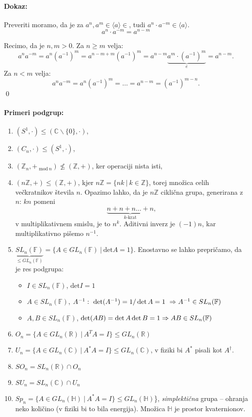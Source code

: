 \paragraph{Dokaz:}
Preveriti moramo, da je za $a^n,a^m \in \langle a \rangle \in$, tudi $a^n\cdot a^{-m} \in \langle a\rangle$.
\[
	a^n\cdot a^{-m} = a^{n-m}
\]

\ni Recimo, da je $n,m > 0$. Za $n \geq m$ velja:
\[
	a^n a^{-m} = a^n (a^{-1})^m = a^{n-m+m} (a^{-1})^m = a^{n-m} \underbrace{a^m\cdot(a^{-1})^m}_{e} = a^{n-m}.
\]
Za $n < m$ velja:
\[
	a^n a^{-m} = a^n(a^{-1})^m = \ldots = a^{n-m} = (a^{-1})^{m-n}.
\]
\qed

\paragraph{Primeri podgrup:}
\begin{enumerate}
	\item{$(S^1,\cdot) \leq (\mathbb{C}\backslash\{0\}, \cdot)$},
	\item{$(C_n,\cdot) \leq (S^1, \cdot)$},
	\item{$(\mathbb{Z}_n, +\ {}_{\text{mod}\ n}) \nleq (\mathbb{Z}, +)$, ker operaciji nista isti,}
	\item{$(n\mathbb{Z}, +) \leq (\mathbb{Z}, +)$, kjer $n\mathbb{Z} = \{nk\ |\ k \in \mathbb{Z}\}$, torej mno\v zica celih ve\v ckratnikov
		\v stevila $n$. Opazimo lahko, da je $n\mathbb{Z}$ cikli\v cna grupa, generirana z $n$: $kn$ pomeni
		\[
			\underbrace{n + n + n \ldots + n}_{k\text{-krat}},
		\] v multiplikativnem smislu, je to $n^k$. Aditivni inverz je $(-1)n$, kar multiplikativno pi\v semo $n^{-1}$.}
	\item{$\underbrace{SL_n(\mathbb{F})}_{\leq GL_n(\mathbb{F})} = \{A \in GL_n(\mathbb{F})\ |\ \text{det}A = 1\}$. Enostavno se lahko prepri\v camo, da je
		res podgrupa:
		\begin{itemize}
			\item{$I \in SL_n(\mathbb{F})$, $\text{det}I = 1$}
			\item{$A \in SL_n(\mathbb{F})$, $A^{-1}:\ \det (A^{-1}) = 1/\det A = 1\ \Rightarrow A^{-1} \in SL_n(\mathbb{F})$}
			\item{$A,B \in SL_n(\mathbb{F})$, $\det (AB) = \det A\det B = 1 \Rightarrow AB \in SL_n(\mathbb{F})$}
		\end{itemize}}
	\item{$O_n = \{A \in GL_n(\mathbb{R})\ |\ A^T A = I\} \leq GL_n (\mathbb{R})$}
	\item{$U_n = \{A \in GL_n(\mathbb{C})\ |\ A^* A = I\} \leq GL_n (\mathbb{C})$, v fiziki bi $A^*$ pisali kot $A^\dagger$.}
	\item{$SO_n = SL_n (\mathbb{R}) \cap O_n$}
	\item{$SU_n = SL_n (\mathbb{C}) \cap U_n$}
	\item{$Sp_n = \{A \in GL_n(\mathbb{H})\ |\ A^* A = I\} \leq GL_n (\mathbb{H})$\}, \emph{simplekti\v cna} grupa -- ohranja neko koli\v cino (v fiziki bi to bila energija). Mno\v zica
		$\mathbb{H}$ je prostor kvaternionov.}
\end{enumerate}

